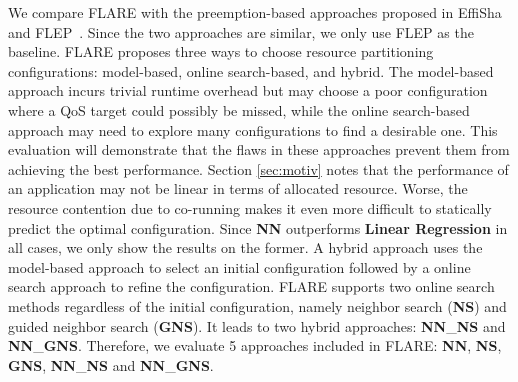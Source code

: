 We compare FLARE with the preemption-based approaches proposed in EffiSha~\cite{Chen:PPoPP2017} and
FLEP~\cite{Wu:ASPLOS2017}. Since the two approaches are similar, we only use FLEP as the baseline.
FLARE proposes three ways to choose resource partitioning configurations: model-based, online search-based,
and hybrid. The model-based approach incurs trivial runtime overhead but may choose a poor
configuration where a QoS target could possibly be missed, while the online search-based approach may need to explore many configurations
to find a desirable one. This evaluation will demonstrate that the flaws in these approaches prevent them from achieving the best performance.
Section \ref{sec:motiv} notes that the performance of an application may not be linear in terms of allocated resource. Worse, the resource contention due to co-running makes it even more difficult to statically predict the optimal configuration.
Since \textbf{NN} outperforms \textbf{Linear Regression} in all cases, we only show the results on the former.
A hybrid approach uses the model-based approach to select an initial
configuration followed by a online search approach to refine the configuration. %
FLARE supports
two online search methods regardless of the initial configuration, namely neighbor search
(\textbf{NS}) and guided neighbor search (\textbf{GNS}).
It leads to two hybrid approaches: \textbf{NN}\_\textbf{NS} and \textbf{NN}\_\textbf{GNS}. %
Therefore, we evaluate 5
approaches included in FLARE: \textbf{NN}, \textbf{NS}, \textbf{GNS}, \textbf{NN}\_\textbf{NS} and \textbf{NN}\_\textbf{GNS}. %
%	
